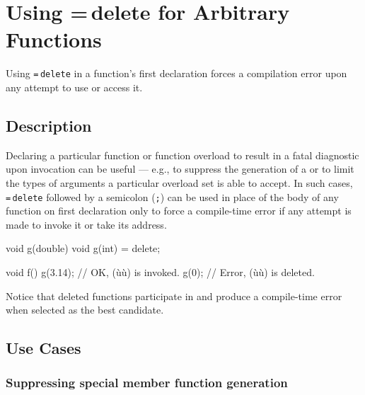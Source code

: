 \newpage
\section[Deleted Functions]{Using {\SecCode =}\,{\SecCode delete} for Arbitrary Functions}\label{deleted-functions}


Using \lstinline!=!\,\lstinline!delete! in a function's first declaration
forces a compilation error upon any attempt to use or access it.

\subsection[Description]{Description}\label{description}

Declaring a particular function or function overload to result in a
fatal diagnostic upon invocation can be useful --- e.g., to suppress the
generation of a  or to limit the types of
arguments a particular overload set is able to accept. In such cases,
\lstinline!=!\,\lstinline!delete! followed by a semicolon (\lstinline!;!) can be used in place of the body of any
function on first declaration only to force a compile-time error if
any attempt is made to invoke it or take its address.

\begin{emcppslisting}
void g(double) { }
void g(int) = delete;

void f()
{
    g(3.14);  // OK, (ù{}ù) is invoked.
    g(0);     // Error, (ù{}ù) is deleted.
}
\end{emcppslisting}

\noindent Notice that deleted functions participate in 
and produce a compile-time error when selected as the best candidate.

\subsection[Use Cases]{Use Cases}\label{use-cases}

\subsubsection[Suppressing special member function generation]{Suppressing special member function generation}\label{suppressing-special-member-function-generation}

